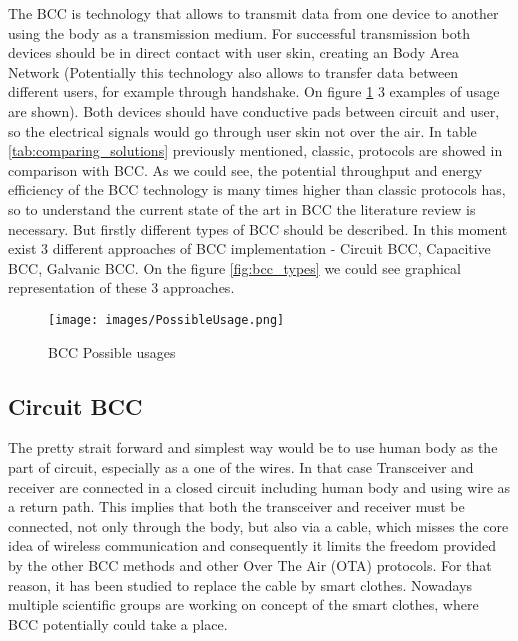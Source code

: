 \quad The BCC is technology that allows to transmit data from one device to another using the body as a transmission medium. For successful transmission both devices should be in direct contact with user skin, creating an Body Area Network (Potentially this technology also allows to transfer data between different users, for example through handshake. On figure \ref{fig:bcc_usage} 3 examples of usage are shown). Both devices should have conductive pads between circuit and user, so the electrical signals would go through user skin not over the air. In table \ref{tab:comparing_solutions} previously mentioned, classic, protocols are showed in comparison with BCC. As we could see, the potential throughput and energy efficiency of the BCC technology is many times higher than classic protocols has, so to understand the current state of the art in BCC the literature review is necessary. But firstly different types of BCC should be described. In this moment exist 3 different approaches of BCC implementation - Circuit BCC, Capacitive BCC, Galvanic BCC. On the figure \ref{fig:bcc_types} we could see graphical representation of these 3 approaches.

\begin{figure}[!h]
    \centering
    \texttt{[image: images/PossibleUsage.png]}
    \caption{BCC Possible usages}
    \label{fig:bcc_usage}
\end{figure}

\subsection{Circuit BCC}

\quad The pretty strait forward and simplest way would be to use human body as the part of circuit, especially as a one of the wires. In that case Transceiver and receiver are connected in a closed circuit including human body and using wire as a return path. This implies that both the transceiver and receiver must be connected, not only through the body, but also via a cable, which misses the core idea of wireless communication and consequently it limits the freedom provided by the other BCC methods and other Over The Air (OTA) protocols. For that reason, it has been studied to replace the cable by smart clothes. Nowadays multiple scientific groups are working on concept of the smart clothes, where BCC potentially could take a place. 

